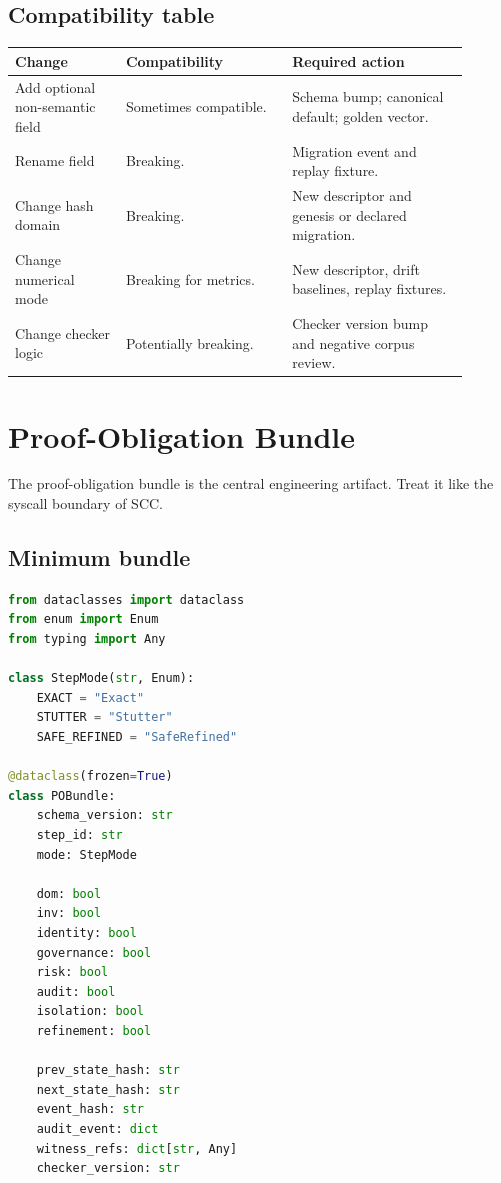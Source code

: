 \documentclass[11pt,oneside]{article}
\begin{document}
\subsection{Compatibility table}
\begin{longtable}{@{}p{0.22\linewidth}p{0.33\linewidth}p{0.35\linewidth}@{}}
\toprule
\textbf{Change} & \textbf{Compatibility} & \textbf{Required action} \\
\midrule
Add optional non-semantic field & Sometimes compatible. & Schema bump; canonical default; golden vector. \\
Rename field & Breaking. & Migration event and replay fixture. \\
Change hash domain & Breaking. & New descriptor and genesis or declared migration. \\
Change numerical mode & Breaking for metrics. & New descriptor, drift baselines, replay fixtures. \\
Change checker logic & Potentially breaking. & Checker version bump and negative corpus review. \\
\bottomrule
\end{longtable}


\section{Proof-Obligation Bundle}
The proof-obligation bundle is the central engineering artifact. Treat it like the syscall boundary of SCC.

\subsection{Minimum bundle}
\begin{lstlisting}[language=Python,caption={Proof-obligation bundle.}]
from dataclasses import dataclass
from enum import Enum
from typing import Any

class StepMode(str, Enum):
    EXACT = "Exact"
    STUTTER = "Stutter"
    SAFE_REFINED = "SafeRefined"

@dataclass(frozen=True)
class POBundle:
    schema_version: str
    step_id: str
    mode: StepMode

    dom: bool
    inv: bool
    identity: bool
    governance: bool
    risk: bool
    audit: bool
    isolation: bool
    refinement: bool

    prev_state_hash: str
    next_state_hash: str
    event_hash: str
    audit_event: dict
    witness_refs: dict[str, Any]
    checker_version: str
\end{lstlisting}
\end{document}
